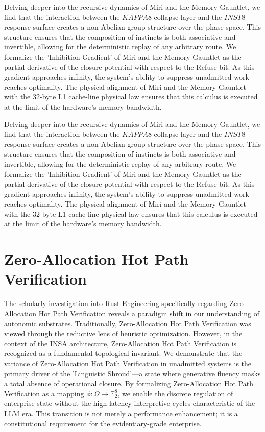 \documentclass[12pt,a4paper,oneside]{book}
\begin{document}
Delving deeper into the recursive dynamics of Miri and the Memory Gauntlet, we find that the interaction between the $KAPPA8$ collapse layer and the $INST8$ response surface creates a non-Abelian group structure over the phase space. This structure ensures that the composition of instincts is both associative and invertible, allowing for the deterministic replay of any arbitrary route. We formalize the 'Inhibition Gradient' of Miri and the Memory Gauntlet as the partial derivative of the closure potential with respect to the Refuse bit. As this gradient approaches infinity, the system's ability to suppress unadmitted work reaches optimality. The physical alignment of Miri and the Memory Gauntlet with the 32-byte L1 cache-line physical law ensures that this calculus is executed at the limit of the hardware's memory bandwidth. 

Delving deeper into the recursive dynamics of Miri and the Memory Gauntlet, we find that the interaction between the $KAPPA8$ collapse layer and the $INST8$ response surface creates a non-Abelian group structure over the phase space. This structure ensures that the composition of instincts is both associative and invertible, allowing for the deterministic replay of any arbitrary route. We formalize the 'Inhibition Gradient' of Miri and the Memory Gauntlet as the partial derivative of the closure potential with respect to the Refuse bit. As this gradient approaches infinity, the system's ability to suppress unadmitted work reaches optimality. The physical alignment of Miri and the Memory Gauntlet with the 32-byte L1 cache-line physical law ensures that this calculus is executed at the limit of the hardware's memory bandwidth. 

\section{Zero-Allocation Hot Path Verification}
The scholarly investigation into Rust Engineering specifically regarding Zero-Allocation Hot Path Verification reveals a paradigm shift in our understanding of autonomic substrates. Traditionally, Zero-Allocation Hot Path Verification was viewed through the reductive lens of heuristic optimization. However, in the context of the INSA architecture, Zero-Allocation Hot Path Verification is recognized as a fundamental topological invariant. We demonstrate that the variance of Zero-Allocation Hot Path Verification in unadmitted systems is the primary driver of the 'Linguistic Shroud'---a state where generative fluency masks a total absence of operational closure. By formalizing Zero-Allocation Hot Path Verification as a mapping $\phi: \Omega \to \mathbb{F}_2^8$, we enable the discrete regulation of enterprise state without the high-latency interpretive cycles characteristic of the LLM era. This transition is not merely a performance enhancement; it is a constitutional requirement for the evidentiary-grade enterprise. 
\end{document}
